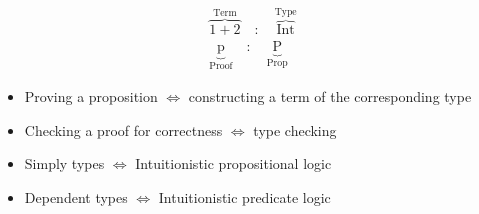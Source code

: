 \documentclass[convert={density=500}, border=2pt, varwidth=8in]{standalone}
\begin{document}
\begin{center}
\begin{align*}
      \overbrace{1 + 2}^{\text{Term}} \quad : \quad \overbrace{\text{Int}}^{\text{Type}} \\
      \underbrace{\text{p}}_{\text{Proof}} \quad : \quad \underbrace{\text{P}}_{\text{Prop}}
\end{align*}
\end{center}

\begin{itemize}[label=$\ast$]
  \item Proving a proposition $\Longleftrightarrow$ constructing a term of the
    corresponding type
  \item Checking a proof for correctness $\Longleftrightarrow$ type checking
  \item Simply types $\Longleftrightarrow$ Intuitionistic propositional logic
  \item Dependent types $\Longleftrightarrow$ Intuitionistic predicate logic
\end{itemize}
\end{document}
